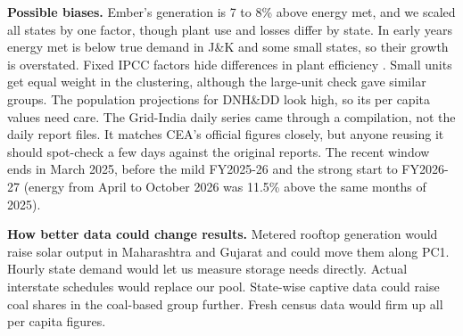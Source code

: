 \documentclass[10pt,a4paper]{article}
\begin{document}
\textbf{Possible biases.} Ember's generation is 7 to 8\% above energy met, and we scaled all states by one factor, though plant use and losses differ by state. In early years energy met is below true demand in J\&K and some small states, so their growth is overstated. Fixed IPCC factors hide differences in plant efficiency \cite{embermeth}. Small units get equal weight in the clustering, although the large-unit check gave similar groups. The population projections for DNH\&DD look high, so its per capita values need care. The Grid-India daily series came through a compilation, not the daily report files. It matches CEA's official figures closely, but anyone reusing it should spot-check a few days against the original reports. The recent window ends in March 2025, before the mild FY2025-26 and the strong start to FY2026-27 (energy from April to October 2026 was 11.5\% above the same months of 2025).

\textbf{How better data could change results.} Metered rooftop generation would raise solar output in Maharashtra and Gujarat and could move them along PC1. Hourly state demand would let us measure storage needs directly. Actual interstate schedules would replace our pool. State-wise captive data could raise coal shares in the coal-based group further. Fresh census data would firm up all per capita figures.
\end{document}
